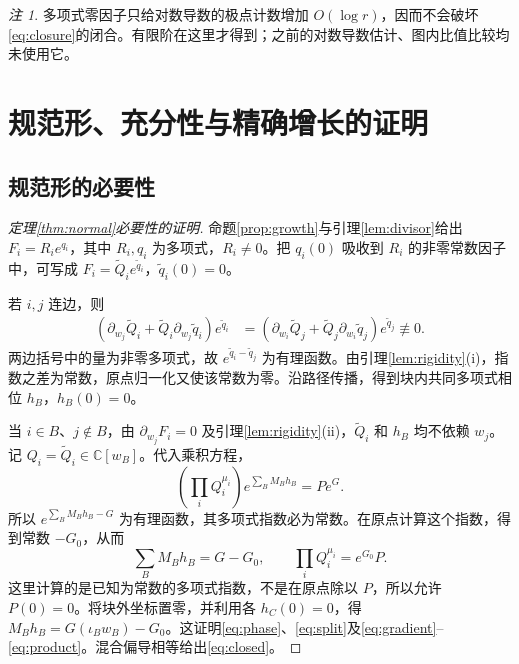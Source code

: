 \documentclass[UTF8,11pt,a4paper,fontset=fandol]{ctexart}
\theoremstyle{definition}\newtheorem{definition}[theorem]{定义}
\theoremstyle{remark}\newtheorem{remark}[theorem]{注}
\newcommand{\C}{\mathbb C}\newcommand{\N}{\mathbb N}
\begin{document}
\begin{remark}
多项式零因子只给对数导数的极点计数增加 $O(\log r)$，因而不会破坏\eqref{eq:closure}的闭合。有限阶在这里才得到；之前的对数导数估计、图内比值比较均未使用它。
\end{remark}

\section{规范形、充分性与精确增长的证明}
\subsection{规范形的必要性}
\begin{proof}[定理\ref{thm:normal}必要性的证明]
命题\ref{prop:growth}与引理\ref{lem:divisor}给出 $F_i=R_i e^{q_i}$，其中 $R_i,q_i$ 为多项式，$R_i\ne0$。把 $q_i(0)$ 吸收到 $R_i$ 的非零常数因子中，可写成 $F_i=\widetilde Q_i e^{\widetilde q_i}$，$\widetilde q_i(0)=0$。

若 $i,j$ 连边，则
\begin{align*}
(\partial_{w_j}\widetilde Q_i+\widetilde Q_i\partial_{w_j}\widetilde q_i)e^{\widetilde q_i}
&=(\partial_{w_i}\widetilde Q_j+\widetilde Q_j\partial_{w_i}\widetilde q_j)e^{\widetilde q_j}
\not\equiv0.
\end{align*}
两边括号中的量为非零多项式，故 $e^{\widetilde q_i-\widetilde q_j}$ 为有理函数。由引理\ref{lem:rigidity}(i)，指数之差为常数，原点归一化又使该常数为零。沿路径传播，得到块内共同多项式相位 $h_B$，$h_B(0)=0$。

当 $i\in B$、$j\notin B$，由 $\partial_{w_j}F_i=0$ 及引理\ref{lem:rigidity}(ii)，$\widetilde Q_i$ 和 $h_B$ 均不依赖 $w_j$。记 $Q_i=\widetilde Q_i\in\C[w_B]$。代入乘积方程，
\[
\left(\prod_iQ_i^{\mu_i}\right)e^{\sum_BM_Bh_B}=Pe^G.
\]
所以 $e^{\sum_BM_Bh_B-G}$ 为有理函数，其多项式指数必为常数。在原点计算这个指数，得到常数 $-G_0$，从而
\begin{equation}\label{eq:phaseidentity}
\sum_BM_Bh_B=G-G_0,\qquad \prod_iQ_i^{\mu_i}=e^{G_0}P.
\end{equation}
这里计算的是已知为常数的多项式指数，不是在原点除以 $P$，所以允许 $P(0)=0$。将块外坐标置零，并利用各 $h_C(0)=0$，得 $M_Bh_B=G(\iota_Bw_B)-G_0$。这证明\eqref{eq:phase}、\eqref{eq:split}及\eqref{eq:gradient}--\eqref{eq:product}。混合偏导相等给出\eqref{eq:closed}。
\end{proof}
\end{document}
